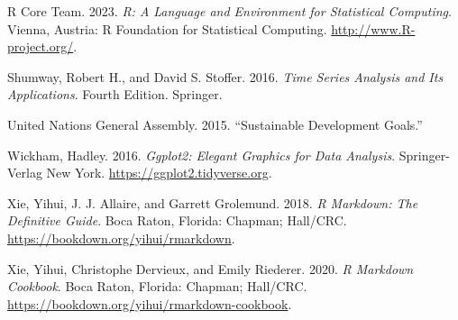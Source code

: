 \begin{CSLReferences}{1}{0}
\leavevmode{}%
R Core Team. 2023. \emph{R: A Language and Environment for Statistical Computing}. Vienna, Austria: R Foundation for Statistical Computing. \url{http://www.R-project.org/}.

\leavevmode{}%
Shumway, Robert H., and David S. Stoﬀer. 2016. \emph{Time Series Analysis and Its Applications}. Fourth Edition. Springer.

\leavevmode{}%
United Nations General Assembly. 2015. {``Sustainable Development Goals.''}

\leavevmode{}%
Wickham, Hadley. 2016. \emph{Ggplot2: Elegant Graphics for Data Analysis}. Springer-Verlag New York. \url{https://ggplot2.tidyverse.org}.

\leavevmode{}%
Xie, Yihui, J. J. Allaire, and Garrett Grolemund. 2018. \emph{R Markdown: The Definitive Guide}. Boca Raton, Florida: Chapman; Hall/CRC. \url{https://bookdown.org/yihui/rmarkdown}.

\leavevmode{}%
Xie, Yihui, Christophe Dervieux, and Emily Riederer. 2020. \emph{R Markdown Cookbook}. Boca Raton, Florida: Chapman; Hall/CRC. \url{https://bookdown.org/yihui/rmarkdown-cookbook}.

\end{CSLReferences}



\address{%
Mikkel Meyer Andersen\\
Department of Mathematical Sciences, Aalborg University, Denmark\\%
Skjernvej 4A\\ 9220 Aalborg Ø, Denmark\\
%
%
\textit{ORCiD: \href{https://orcid.org/0000-0002-0234-0266}{0000-0002-0234-0266}}\\%
\href{mailto:mikl@math.aau.dk}{\nolinkurl{mikl@math.aau.dk}}%
}

\address{%
Søren Højsgaard\\
Department of Mathematical Sciences, Aalborg University, Denmark\\%
Skjernvej 4A\\ 9220 Aalborg Ø, Denmark\\
%
%
\textit{ORCiD: \href{https://orcid.org/0000-0002-3269-9552}{0000-0002-3269-9552}}\\%
\href{mailto:sorenh@math.aau.dk}{\nolinkurl{sorenh@math.aau.dk}}%
}
